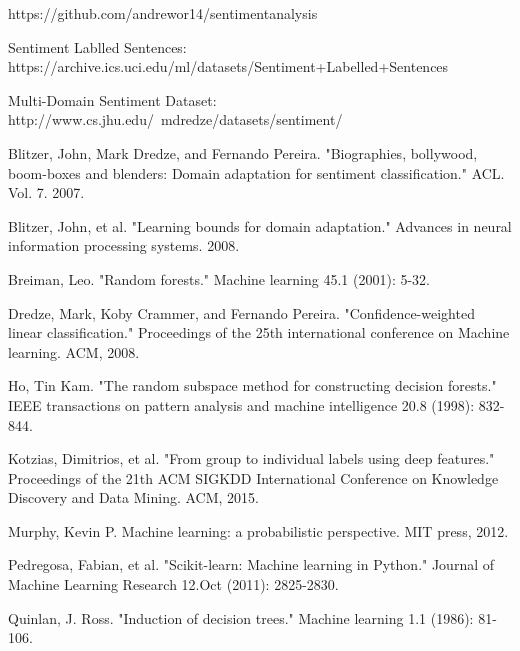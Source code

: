 \documentclass{article} %
\begin{document}
\begin{thebibliography}{}

https://github.com/andrewor14/sentimentanalysis

Sentiment Lablled Sentences: https://archive.ics.uci.edu/ml/datasets/Sentiment+Labelled+Sentences

Multi-Domain Sentiment Dataset: http://www.cs.jhu.edu/~mdredze/datasets/sentiment/

Blitzer, John, Mark Dredze, and Fernando Pereira. "Biographies, bollywood, boom-boxes and blenders: Domain adaptation for sentiment classification." ACL. Vol. 7. 2007.

Blitzer, John, et al. "Learning bounds for domain adaptation." Advances in neural information processing systems. 2008.

Breiman, Leo. "Random forests." Machine learning 45.1 (2001): 5-32.

Dredze, Mark, Koby Crammer, and Fernando Pereira. "Confidence-weighted linear classification." Proceedings of the 25th international conference on Machine learning. ACM, 2008.

Ho, Tin Kam. "The random subspace method for constructing decision forests." IEEE transactions on pattern analysis and machine intelligence 20.8 (1998): 832-844.

Kotzias, Dimitrios, et al. "From group to individual labels using deep features." Proceedings of the 21th ACM SIGKDD International Conference on Knowledge Discovery and Data Mining. ACM, 2015.

Murphy, Kevin P. Machine learning: a probabilistic perspective. MIT press, 2012.

Pedregosa, Fabian, et al. "Scikit-learn: Machine learning in Python." Journal of Machine Learning Research 12.Oct (2011): 2825-2830.

Quinlan, J. Ross. "Induction of decision trees." Machine learning 1.1 (1986): 81-106.
 
\end{thebibliography}
\end{document}
